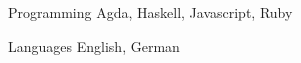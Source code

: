 

\begin{cvskills}

  \cvskill
    {Programming} %
    {Agda, Haskell, Javascript, Ruby} %


  \cvskill
    {Languages} %
    {English, German} %

\end{cvskills}
